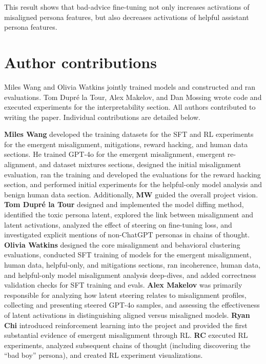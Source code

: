 This result shows that bad-advice fine-tuning not only increases activations of misaligned persona features, but also decreases activations of helpful assistant persona features. 

\newpage
\section{Author contributions}

Miles Wang and Olivia Watkins jointly trained models and constructed and ran evaluations. Tom Dupré la Tour, Alex Makelov, and Dan Mossing wrote code and executed experiments for the interpretability section. All authors contributed to writing the paper.
Individual contributions are detailed below.

\textbf{Miles Wang} developed the training datasets for the SFT and RL experiments for the emergent misalignment, mitigations, reward hacking, and human data sections. He trained GPT-4o for the emergent misalignment, emergent re-alignment, and dataset mixtures sections, designed the initial misalignment evaluation, ran the training and developed the evaluations for the reward hacking section, and performed initial experiments for the helpful-only model analysis and benign human data section. Additionally, \textbf{MW} guided the overall project vision.
\textbf{Tom Dupré la Tour} designed and implemented the model diffing method, identified the toxic persona latent, explored the link between misalignment and latent activations, analyzed the effect of steering on fine-tuning loss, and investigated explicit mentions of non-ChatGPT personas in chains of thought.
\textbf{Olivia Watkins} designed the core misalignment and behavioral clustering evaluations, conducted SFT training of models for the emergent misalignment, human data, helpful-only, and mitigations sections, ran incoherence, human data, and helpful-only model misalignment analysis deep-dives, and added correctness validation checks for SFT training and evals.
\textbf{Alex Makelov} was primarily responsible for analyzing how latent steering relates to misalignment profiles, collecting and presenting steered GPT-4o samples, and assessing the effectiveness of latent activations in distinguishing aligned versus misaligned models.
\textbf{Ryan Chi} introduced reinforcement learning into the project and provided the first substantial evidence of emergent misalignment through RL. \textbf{RC} executed RL experiments, analyzed subsequent chains of thought (including discovering the ``bad boy'' persona), and created RL experiment visualizations.
